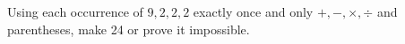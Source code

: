 Using each occurrence of $9,2,2,2$ exactly once and only $+,-,\times,\div$ and parentheses, make 24 or prove it impossible.
